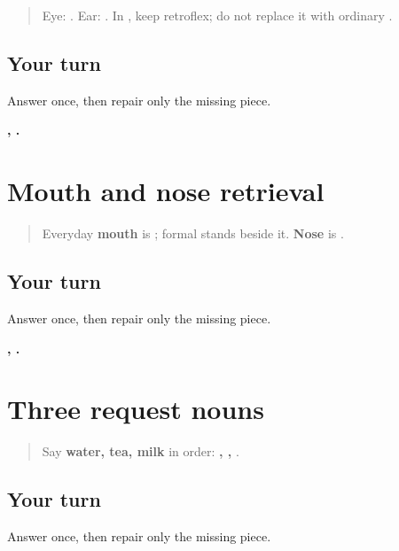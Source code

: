 \begin{quote}
Eye: \textbf{}. Ear: \textbf{}. In \textbf{}, keep \textbf{} retroflex; do not replace it with ordinary \textbf{}.
\end{quote}

\subsection*{Your turn}
Answer once, then repair only the missing piece.

\begin{tcolorbox}[breakable,colback=teal!4,colframe=teal!35!black,title={Before you move on}]
\textbf{, .}
\end{tcolorbox}
\section[tond / naak]{Mouth and nose retrieval}

\label{lesson:MR-R14-mouth-nose}



\begin{quote}
Everyday \textbf{mouth} is \textbf{}; formal \textbf{} stands beside it. \textbf{Nose} is \textbf{}.
\end{quote}

\subsection*{Your turn}
Answer once, then repair only the missing piece.

\begin{tcolorbox}[breakable,colback=teal!4,colframe=teal!35!black,title={Before you move on}]
\textbf{, .}
\end{tcolorbox}
\section[paani / chaha / dudh]{Three request nouns}

\label{lesson:MR-R14-food}



\begin{quote}
Say \textbf{water, tea, milk} in order: \textbf{, , }.
\end{quote}

\subsection*{Your turn}
Answer once, then repair only the missing piece.

